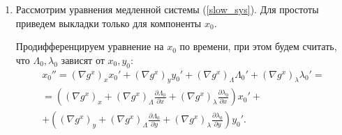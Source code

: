 \begin{enumerate}
$$\Lambda_0 = 0 \quad \Rightarrow \quad \v C = \begin{pmatrix} \frac{\lambda_0'}{\alpha} \\ 0 \end{pmatrix}$$

Также заметим, что компоненты правой части $g^x, g^y$ не зависят от $\Lambda$, поэтому векторы, входящие в неоднородность в уравнениях (\ref{x1y1_eq}) имеют вид:

$$\begin{pmatrix} (\nabla g^x)_\Lambda \\ (\nabla g^x)_\lambda \end{pmatrix} = \begin{pmatrix} 0 \\ * \end{pmatrix},\qquad \begin{pmatrix} (\nabla g^y)_\Lambda \\ (\nabla g^y)_\lambda \end{pmatrix} = \begin{pmatrix} 0 \\ * \end{pmatrix}.$$

Тогда неоднородность в системе (\ref{x1y1_eq}) вырождается:

$$\left( \begin{pmatrix} (\nabla g^x)_\Lambda \\ (\nabla g^x)_\lambda \end{pmatrix},\v C \right) = \left( \begin{pmatrix} (\nabla g^y)_\Lambda \\ (\nabla g^y)_\lambda \end{pmatrix},\v C \right) = 0.$$

Таким образом, в системе (\ref{fulltn}) дифференциальное уравнение на $(x_1,y_1)$ является однородным.

\item 

Рассмотрим уравнения медленной системы (\ref{slow_sys}). Для простоты приведем выкладки только для компоненты $x_0$.

Продифференцируем уравнение на $x_0$ по времени, при этом будем считать, что $\Lambda_0, \lambda_0$ зависят от $x_0,y_0$:
\begin{multline}
x_0'' = (\nabla g^x)_x x_0' + (\nabla g^x)_y y_0' + (\nabla g^x)_\Lambda \Lambda_0' + (\nabla g^x)_\lambda \lambda_0' = \\
= 
\left( (\nabla g^x)_x + (\nabla g^x)_\Lambda\frac{\partial \Lambda_0}{\partial x} + (\nabla g^x)_\lambda\frac{\partial \lambda_0}{\partial x} \right) x_0' +\\
+\left( (\nabla g^x)_y + (\nabla g^x)_\Lambda\frac{\partial \Lambda_0}{\partial y} + (\nabla g^x)_\lambda\frac{\partial \lambda_0}{\partial y} \right) y_0'.
\label{xdd_eq}
\end{multline}


\end{enumerate}
